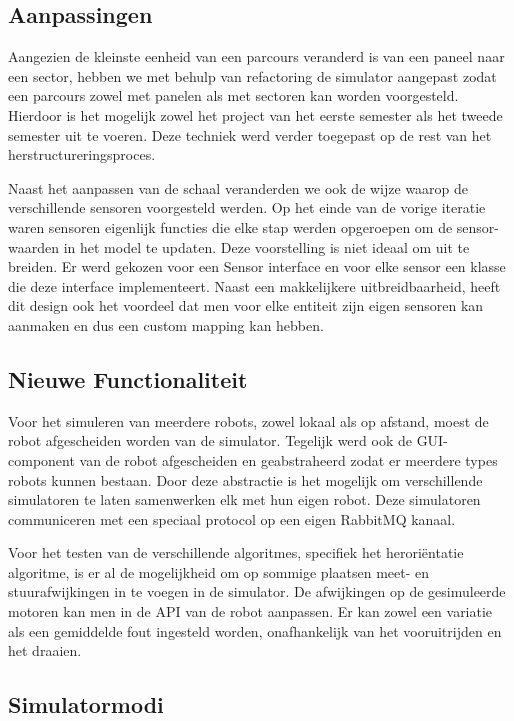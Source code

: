 \documentclass[12pt,a4paper]{report}
\begin{document}
\subsection{Aanpassingen}

Aangezien de kleinste eenheid van een parcours veranderd is van een paneel naar een sector, hebben we met behulp van refactoring de simulator aangepast zodat een parcours zowel met panelen als met sectoren kan worden voorgesteld. Hierdoor is het mogelijk zowel het project van het eerste semester als het tweede semester uit te voeren. Deze techniek werd verder toegepast op de rest van het herstructureringsproces. 

Naast het aanpassen van de schaal veranderden we ook de wijze waarop de verschillende sensoren voorgesteld werden. Op het einde van de vorige iteratie waren sensoren eigenlijk functies die elke stap werden opgeroepen om de sensor-waarden in het model te updaten. Deze voorstelling is niet ideaal om uit te breiden. Er werd gekozen voor een Sensor interface en voor elke sensor een klasse die deze interface implementeert. Naast een makkelijkere uitbreidbaarheid, heeft dit design ook het voordeel dat men voor elke entiteit zijn eigen sensoren kan aanmaken en dus een custom mapping kan hebben.

\subsection{Nieuwe Functionaliteit}

Voor het simuleren van meerdere robots, zowel lokaal als op afstand, moest de robot afgescheiden worden van de simulator. Tegelijk werd ook de GUI-component van de robot afgescheiden en geabstraheerd zodat er meerdere types robots kunnen bestaan. Door deze abstractie is het mogelijk om verschillende simulatoren te laten samenwerken elk met hun eigen robot. Deze simulatoren communiceren met een speciaal protocol op een eigen RabbitMQ kanaal.

Voor het testen van de verschillende algoritmes, specifiek het herori\"entatie algoritme, is er al de mogelijkheid om op sommige plaatsen meet- en stuurafwijkingen in te voegen in de simulator. De afwijkingen op de gesimuleerde motoren kan men in de API van de robot aanpassen. Er kan zowel een variatie als een gemiddelde fout ingesteld worden, onafhankelijk van het vooruitrijden en het draaien.

\subsection{Simulatormodi}
\end{document}
